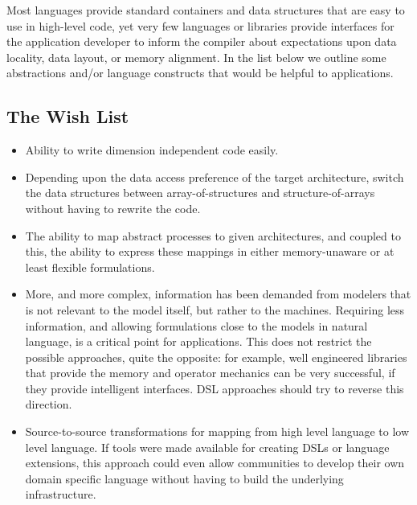 Most languages provide standard containers and data structures
that are easy to use in high-level code, yet very few languages
or libraries provide interfaces for the application developer to
inform the compiler about expectations upon data locality, data layout,
or memory alignment. In the list below we outline some abstractions
and/or language constructs that would be helpful to applications.


\subsection{The Wish List}
\begin{itemize}
\item Ability to write dimension independent code easily.
\item Depending upon the data access preference of the target
  architecture, switch the data structures between array-of-structures and
  structure-of-arrays without having to rewrite the code.
\item The ability to map abstract processes to given architectures,
  and coupled to this, the ability to express these mappings in either
  memory-unaware or at least flexible formulations. 
\item More, and more complex, information has been demanded from
  modelers that is not relevant to the model itself, but rather to the
  machines. Requiring less information, and allowing
  formulations close to the models in natural language, is a critical
  point for applications. This does not restrict the possible
  approaches, quite the opposite: for example, well engineered
  libraries that provide the memory and operator mechanics can be very
  successful, if they provide intelligent interfaces. DSL approaches should try
  to reverse this direction.  
\item Source-to-source transformations for mapping from high level
  language to low level language.  If tools were made available for
  creating DSLs or language extensions, this approach could even allow
  communities to develop their own domain specific language without
  having to build the underlying infrastructure.
\end{itemize}
